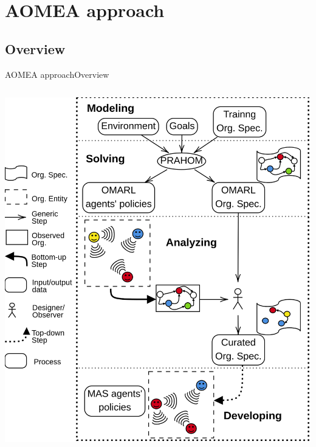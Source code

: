 

\section{AOMEA approach}

\subsection{Overview}

\begin{frame}{AOMEA approach}{Overview}

    \begin{columns}

        \hspace{-7ex}
        \begin{column}{0.5\textwidth}

            \centering
            \vspace{-23.5ex}
            \includegraphics[width=0.95\linewidth]{figures/AOMEA_illustrative_global_view.png}


\end{column}
\end{columns}
\end{frame}
